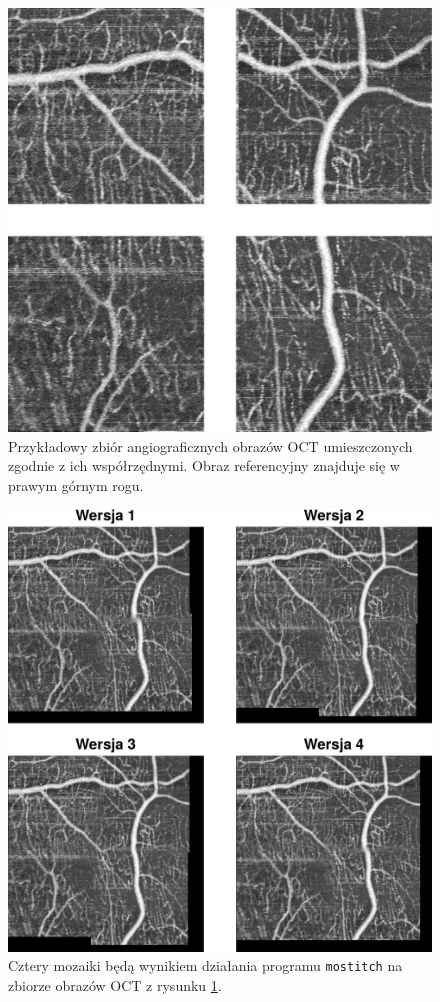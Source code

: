 \begin{figure}[htb]
  \centering
  \includegraphics[width=\textwidth]{gfx/zbior_3}
  \caption{Przykładowy zbiór angiograficznych obrazów OCT umieszczonych zgodnie z ich współrzędnymi. Obraz referencyjny znajduje się w prawym górnym rogu.}
  \label{fig:wyniki_eksperymentow:zbior_3}
\end{figure}

\begin{figure}[htb]
  \centering
  \includegraphics[width=\textwidth]{gfx/wynik_zbior_3}
  \caption{Cztery mozaiki będą wynikiem działania programu \texttt{mostitch} na zbiorze obrazów OCT z rysunku \ref{fig:wyniki_eksperymentow:zbior_3}.}
  \label{fig:wyniki_eksperymentow:wynik_zbior_3}
\end{figure}

